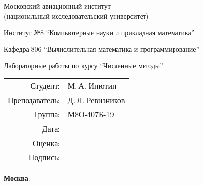 \begin{titlepage}
    \begin{center}
        \bfseries

        {\Large Московский авиационный институт \\ (национальный исследовательский университет)

        }

        \vspace{20pt}

        Институт №8 \enquote{Компьютерные науки и прикладная математика}

        Кафедра 806 \enquote{Вычислительная математика и программирование}

        \vspace{60pt}

        Лабораторные работы по курсу \enquote{Численные методы}

    \end{center}

    \vfill

    \begin{flushright}
        \begin{tabular}{rl}
            Студент:       & М.\,А. Инютин     \\
            Преподаватель: & Д.\,Л. Ревизников \\
            Группа:        & М8О-407Б-19       \\
            Дата:          &                   \\
            Оценка:        &                   \\
            Подпись:       &                   \\
        \end{tabular}
    \end{flushright}

    \begin{center}
        \bfseries
        Москва, \the\year
    \end{center}
\end{titlepage}

\pagebreak
